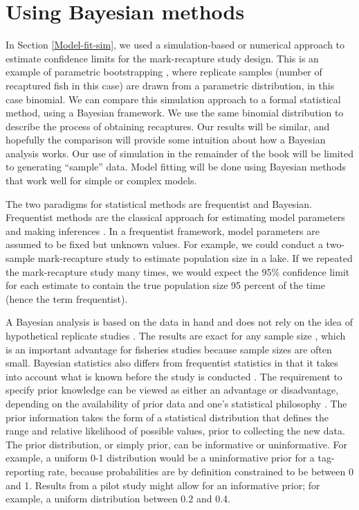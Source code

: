 \documentclass[
]{krantz}
\begin{document}
\hypertarget{JAGS-model-fit}{%
\section{Using Bayesian methods}\label{JAGS-model-fit}}

In Section \ref{Model-fit-sim}, we used a simulation-based or numerical approach to estimate confidence limits for the mark-recapture study design. This is an example of parametric bootstrapping \citep{efron.tibshirani_1993}, where replicate samples (number of recaptured fish in this case) are drawn from a parametric distribution, in this case binomial. We can compare this simulation approach to a formal statistical method, using a Bayesian framework. We use the same binomial distribution to describe the process of obtaining recaptures. Our results will be similar, and hopefully the comparison will provide some intuition about how a Bayesian analysis works. Our use of simulation in the remainder of the book will be limited to generating ``sample'' data. Model fitting will be done using Bayesian methods that work well for simple or complex models.

The two paradigms for statistical methods are frequentist and Bayesian. Frequentist methods are the classical approach for estimating model parameters and making inferences \citep{link.etal_2002, royle.dorazio_2009}. In a frequentist framework, model parameters are assumed to be fixed but unknown values. For example, we could conduct a two-sample mark-recapture study to estimate population size in a lake. If we repeated the mark-recapture study many times, we would expect the 95\% confidence limit for each estimate to contain the true population size 95 percent of the time (hence the term frequentist).

A Bayesian analysis is based on the data in hand and does not rely on the idea of hypothetical replicate studies \citep{mccarthy2007, royle.dorazio_2009}. The results are exact for any sample size \citep{kéry.schaub_2011}, which is an important advantage for fisheries studies because sample sizes are often small. Bayesian statistics also differs from frequentist statistics in that it takes into account what is known before the study is conducted \citep{mccarthy2007}. The requirement to specify prior knowledge can be viewed as either an advantage or disadvantage, depending on the availability of prior data and one's statistical philosophy \citep{ellison_2004, mccarthy2007, kéry_2010, kéry.schaub_2011, dorazio_2016, doll.jacquemin_2018}. The prior information takes the form of a statistical distribution that defines the range and relative likelihood of possible values, prior to collecting the new data. The prior distribution, or simply prior, can be informative or uninformative. For example, a uniform 0-1 distribution would be a uninformative prior for a tag-reporting rate, because probabilities are by definition constrained to be between 0 and 1. Results from a pilot study might allow for an informative prior; for example, a uniform distribution between 0.2 and 0.4.
\end{document}

